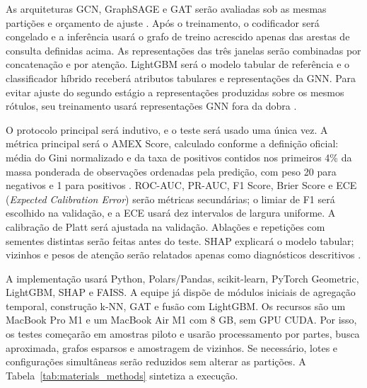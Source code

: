 \documentclass[conference]{IEEEtran}
\begin{document}
As arquiteturas GCN, GraphSAGE e GAT serão avaliadas sob as mesmas partições e orçamento de ajuste \cite{sun2024applyinghybridgraphneural,SUN2025763,ZANDI2025586}. Após o treinamento, o codificador será congelado e a inferência usará o grafo de treino acrescido apenas das arestas de consulta definidas acima. As representações das três janelas serão combinadas por concatenação e por atenção. LightGBM será o modelo tabular de referência e o classificador híbrido receberá atributos tabulares e representações da GNN. Para evitar ajuste do segundo estágio a representações produzidas sobre os mesmos rótulos, seu treinamento usará representações GNN fora da dobra \cite{zheng2022xgboostlightgbm,zhu2024localensemble,yang2026relationalgraphmodelingcredit}.

O protocolo principal será indutivo, e o teste será usado uma única vez. A métrica principal será o AMEX Score, calculado conforme a definição oficial: média do Gini normalizado e da taxa de positivos contidos nos primeiros 4\% da massa ponderada de observações ordenadas pela predição, com peso 20 para negativos e 1 para positivos \cite{amex-default-prediction}. ROC-AUC, PR-AUC, F1 Score, Brier Score e ECE (\textit{Expected Calibration Error}) serão métricas secundárias; o limiar de F1 será escolhido na validação, e a ECE usará dez intervalos de largura uniforme. A calibração de Platt será ajustada na validação. Ablações e repetições com sementes distintas serão feitas antes do teste. SHAP explicará o modelo tabular; vizinhos e pesos de atenção serão relatados apenas como diagnósticos descritivos \cite{BITETTO2023101746,yang2025interpretable,yang2026relationalgraphmodelingcredit}.

A implementação usará Python, Polars/Pandas, scikit-learn, PyTorch Geometric, LightGBM, SHAP e FAISS. A equipe já dispõe de módulos iniciais de agregação temporal, construção k-NN, GAT e fusão com LightGBM. Os recursos são um MacBook Pro M1 e um MacBook Air M1 com 8 GB, sem GPU CUDA. Por isso, os testes começarão em amostras piloto e usarão processamento por partes, busca aproximada, grafos esparsos e amostragem de vizinhos. Se necessário, lotes e configurações simultâneas serão reduzidos sem alterar as partições. A Tabela~\ref{tab:materials_methods} sintetiza a execução.
\end{document}

